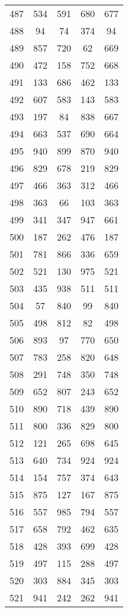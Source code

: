 \documentclass[a4paper,10pt,ngerman]{scrartcl}
\begin{document}
\begin{longtable}[c]{c|c|c|c|c}
    487 & 534 & 591 & 680 & 677 \\
    488 & 94 & 74 & 374 & 94 \\
    489 & 857 & 720 & 62 & 669 \\
    490 & 472 & 158 & 752 & 668 \\
    491 & 133 & 686 & 462 & 133 \\
    492 & 607 & 583 & 143 & 583 \\
    493 & 197 & 84 & 838 & 667 \\
    494 & 663 & 537 & 690 & 664 \\
    495 & 940 & 899 & 870 & 940 \\
    496 & 829 & 678 & 219 & 829 \\
    497 & 466 & 363 & 312 & 466 \\
    498 & 363 & 66 & 103 & 363 \\
    499 & 341 & 347 & 947 & 661 \\
    500 & 187 & 262 & 476 & 187 \\
    501 & 781 & 866 & 336 & 659 \\
    502 & 521 & 130 & 975 & 521 \\
    503 & 435 & 938 & 511 & 511 \\
    504 & 57 & 840 & 99 & 840 \\
    505 & 498 & 812 & 82 & 498 \\
    506 & 893 & 97 & 770 & 650 \\
    507 & 783 & 258 & 820 & 648 \\
    508 & 291 & 748 & 350 & 748 \\
    509 & 652 & 807 & 243 & 652 \\
    510 & 890 & 718 & 439 & 890 \\
    511 & 800 & 336 & 829 & 800 \\
    512 & 121 & 265 & 698 & 645 \\
    513 & 640 & 734 & 924 & 924 \\
    514 & 154 & 757 & 374 & 643 \\
    515 & 875 & 127 & 167 & 875 \\
    516 & 557 & 985 & 794 & 557 \\
    517 & 658 & 792 & 462 & 635 \\
    518 & 428 & 393 & 699 & 428 \\
    519 & 497 & 115 & 288 & 497 \\
    520 & 303 & 884 & 345 & 303 \\
    521 & 941 & 242 & 262 & 941 \\

\end{longtable}
\end{document}
